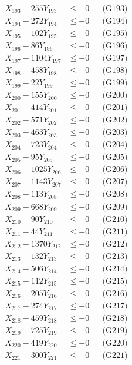 \documentclass[a4paper,10pt]{article}
\begin{document}
{\begin{align}
X_{193} - 255Y_{193} &\leq +0 && \text{(G193)} \\
X_{194} - 272Y_{194} &\leq +0 && \text{(G194)} \\
X_{195} - 102Y_{195} &\leq +0 && \text{(G195)} \\
X_{196} - 86Y_{196} &\leq +0 && \text{(G196)} \\
X_{197} - 1104Y_{197} &\leq +0 && \text{(G197)} \\
X_{198} - 458Y_{198} &\leq +0 && \text{(G198)} \\
X_{199} - 22Y_{199} &\leq +0 && \text{(G199)} \\
X_{200} - 155Y_{200} &\leq +0 && \text{(G200)} \\
\allowbreak
X_{201} - 414Y_{201} &\leq +0 && \text{(G201)} \\
X_{202} - 571Y_{202} &\leq +0 && \text{(G202)} \\
X_{203} - 463Y_{203} &\leq +0 && \text{(G203)} \\
X_{204} - 723Y_{204} &\leq +0 && \text{(G204)} \\
X_{205} - 95Y_{205} &\leq +0 && \text{(G205)} \\
X_{206} - 1025Y_{206} &\leq +0 && \text{(G206)} \\
X_{207} - 1143Y_{207} &\leq +0 && \text{(G207)} \\
X_{208} - 113Y_{208} &\leq +0 && \text{(G208)} \\
X_{209} - 668Y_{209} &\leq +0 && \text{(G209)} \\
X_{210} - 90Y_{210} &\leq +0 && \text{(G210)} \\
\allowbreak
X_{211} - 44Y_{211} &\leq +0 && \text{(G211)} \\
X_{212} - 1370Y_{212} &\leq +0 && \text{(G212)} \\
X_{213} - 132Y_{213} &\leq +0 && \text{(G213)} \\
X_{214} - 506Y_{214} &\leq +0 && \text{(G214)} \\
X_{215} - 112Y_{215} &\leq +0 && \text{(G215)} \\
X_{216} - 205Y_{216} &\leq +0 && \text{(G216)} \\
X_{217} - 274Y_{217} &\leq +0 && \text{(G217)} \\
X_{218} - 459Y_{218} &\leq +0 && \text{(G218)} \\
X_{219} - 725Y_{219} &\leq +0 && \text{(G219)} \\
X_{220} - 419Y_{220} &\leq +0 && \text{(G220)} \\
\allowbreak
X_{221} - 300Y_{221} &\leq +0 && \text{(G221)} \\

\end{align}}
\end{document}
